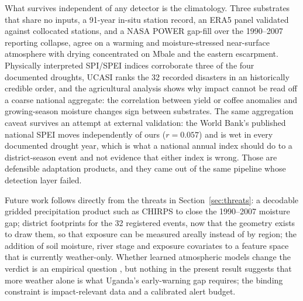 \documentclass[preprint,12pt]{elsarticle}
\begin{document}
What survives independent of any detector is the climatology. Three
substrates that share no inputs, a 91-year in-situ station record, an ERA5 panel
validated against collocated stations, and a NASA POWER gap-fill over the
1990--2007 reporting collapse, agree on a warming and moisture-stressed
near-surface atmosphere with drying concentrated on Mbale and the eastern
escarpment. Physically interpreted SPI/SPEI indices corroborate three of the four
documented droughts, UCASI ranks the 32 recorded disasters in an historically
credible order, and the agricultural analysis shows why impact cannot be read off
a coarse national aggregate: the correlation between yield or coffee anomalies and
growing-season moisture changes sign between substrates. The same aggregation
caveat survives an attempt at external validation: the World Bank's published
national SPEI moves independently of ours ($r=0.057$) and is wet in every
documented drought year, which is what a national annual index should do to a
district-season event and not evidence that either index is wrong. Those are
defensible adaptation products, and they came out of the same pipeline whose
detection layer failed.

Future work follows directly from the threats in Section~\ref{sec:threats}: a
decodable gridded precipitation product such as CHIRPS \cite{funk2015} to close
the 1990--2007 moisture gap; district footprints for the 32 registered events,
now that the geometry exists to draw them, so that exposure can be measured
areally instead of by region; the addition of soil
moisture, river stage and exposure covariates to a feature space that is currently
weather-only. Whether learned atmospheric models change the verdict is an
empirical question \cite{lam2023}, but nothing in the present result suggests that
more weather alone is what Uganda's early-warning gap requires; the binding
constraint is impact-relevant data and a calibrated alert budget.

\end{document}
